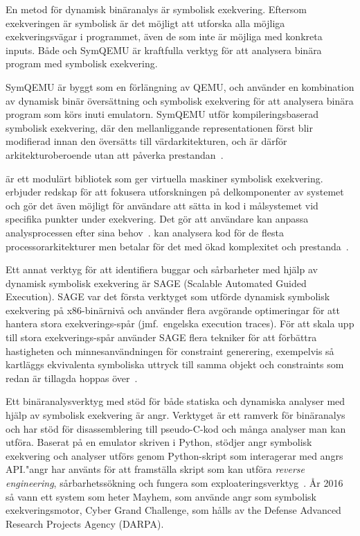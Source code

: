 En metod för dynamisk binäranalys är symbolisk exekvering. Eftersom exekveringen är symbolisk är
det möjligt att utforska alla möjliga exekveringsvägar i programmet, även de som inte är möjliga
med konkreta inputs. Både \stoe{} och SymQEMU är kraftfulla verktyg för att analysera binära program
med symbolisk exekvering.

SymQEMU är byggt som en förlängning av QEMU, och använder en kombination av dynamisk binär
översättning och symbolisk exekvering för att analysera binära program som körs inuti emulatorn.
SymQEMU utför kompileringsbaserad symbolisk exekvering, där den mellanliggande representationen först blir modifierad
innan den översätts till värdarkitekturen, och är därför arkitekturoberoende utan att påverka prestandan~\cite{symqemu}.

\stoe{} är ett modulärt bibliotek som ger virtuella maskiner symbolisk exekvering. \stoe{} erbjuder
redskap för att fokusera utforskningen på delkomponenter av systemet och gör det även
möjligt för användare att sätta in kod i målsystemet vid specifika punkter under
exekvering. Det gör att användare kan anpassa analysprocessen efter sina behov~\cite{s2e}.
\stoe{} kan analysera kod för de flesta processorarkitekturer men betalar för det med ökad
komplexitet och prestanda~\cite{symqemu}.

Ett annat verktyg för att identifiera buggar och sårbarheter med hjälp av dynamisk symbolisk
exekvering är SAGE (Scalable Automated Guided Execution).
SAGE var det första verktyget som utförde dynamisk symbolisk exekvering på x86-binärnivå och använder flera
avgörande optimeringar för att hantera stora exekverings-spår (jmf.\ engelska execution traces).
För att skala upp till stora exekverings-spår använder SAGE flera tekniker för att förbättra hastigheten och
minnesanvändningen för constraint generering, exempelvis så kartläggs ekvivalenta symboliska uttryck till samma
objekt och constraints som redan är tillagda hoppas över~\cite{sage}.

Ett binäranalysverktyg med stöd för både statiska och dynamiska analyser
med hjälp av symbolisk exekvering är angr. Verktyget är ett ramverk för binäranalys och 
har stöd för disassemblering till pseudo-C-kod och många analyser man kan utföra.
Baserat på en emulator skriven i Python, stödjer angr symbolisk exekvering och 
analyser utförs genom Python-skript som interagerar med angrs API."\@ angr har
använts för att framställa skript som kan utföra \emph{reverse engineering},
sårbarhetssökning och fungera som exploateringsverktyg~\cite{angr_docs}. År 2016 
så vann ett system som heter Mayhem, som använde angr som symbolisk 
exekveringsmotor, Cyber Grand Challenge, som hålls av the Defense Advanced Research 
Projects Agency (DARPA). 

